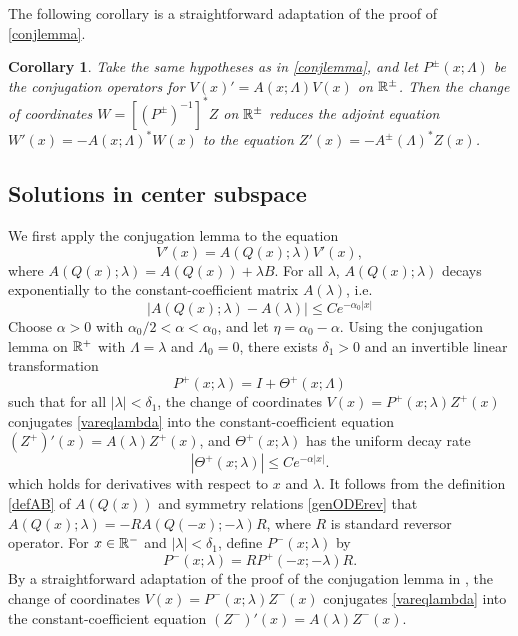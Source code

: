 \documentclass[10pt,reqno]{amsart}
\theoremstyle{plain}
\newtheorem{corollary}[theorem]{Corollary}
\theoremstyle{definition}
\theoremstyle{remark}
\numberwithin{theorem}{section}
\numberwithin{equation}{section}
\begin{document}
The following corollary is a straightforward adaptation of the proof of \cref{conjlemma}.

\begin{corollary}\label{corr:adjconj}
Take the same hypotheses as in \cref{conjlemma}, and let $P^\pm(x; \Lambda)$ be the conjugation operators for $V(x)' = A(x; \Lambda) V(x)$ on $\mathbb{R}^\pm$. Then the change of coordinates $W = [(P^\pm)^{-1}]^* Z$ on $\mathbb{R}^\pm$ reduces the adjoint equation $W'(x) = -A(x; \Lambda)^* W(x)$ to the equation $Z'(x) = -A^\pm(\Lambda)^* Z(x)$.
\end{corollary}

\subsection{Solutions in center subspace}\label{sec:conjvareq}

We first apply the conjugation lemma to the equation
\begin{equation}\label{vareqlambda}
V'(x) = A(Q(x); \lambda) V'(x),
\end{equation}
where $A(Q(x); \lambda) = A(Q(x)) + \lambda B$. For all $\lambda$, $A(Q(x); \lambda)$ decays exponentially to the constant-coefficient matrix $A(\lambda)$, i.e. 
\[
|A(Q(x); \lambda) - A(\lambda)| \leq C e^{-\alpha_0 |x|}
\]
Choose $\alpha > 0$ with $\alpha_0/2 < \alpha < \alpha_0$, and let $\eta = \alpha_0 - \alpha$. Using the conjugation lemma on $\mathbb{R}^+$ with $\Lambda = \lambda$ and $\Lambda_0 = 0$, there exists $\delta_1 > 0$ and an invertible linear transformation 
\begin{equation}\label{defPplus}
P^+(x; \lambda) = I + \Theta^+(x; \Lambda)
\end{equation}
such that for all $|\lambda| < \delta_1$, the change of coordinates $V(x) = P^+(x; \lambda) Z^+(x)$ conjugates \cref{vareqlambda} into the constant-coefficient equation $(Z^+)'(x) = A(\lambda) Z^+(x)$, and $\Theta^+(x; \lambda)$ has the uniform decay rate
\begin{equation}\label{Thetadecay}
|\Theta^+(x; \lambda)| \leq C e^{-\alpha |x|}.
\end{equation}
which holds for derivatives with respect to $x$ and $\lambda$. It follows from the definition \cref{defAB} of $A(Q(x))$ and symmetry relations \cref{genODErev} that $A(Q(x); \lambda) = -R A(Q(-x); -\lambda)R$, where $R$ is standard reversor operator. For $x \in \mathbb{R}^-$ and $|\lambda| < \delta_1$, define $P^-(x; \lambda)$ by
\begin{equation}\label{defPminus}
P^-(x; \lambda) = RP^+(-x; -\lambda)R.
\end{equation}
By a straightforward adaptation of the proof of the conjugation lemma in \cite{Zumbrun2009}, the change of coordinates $V(x) = P^-(x; \lambda) Z^-(x)$ conjugates \cref{vareqlambda} into the constant-coefficient equation $(Z^-)'(x) = A(\lambda) Z^-(x)$.
\end{document}
